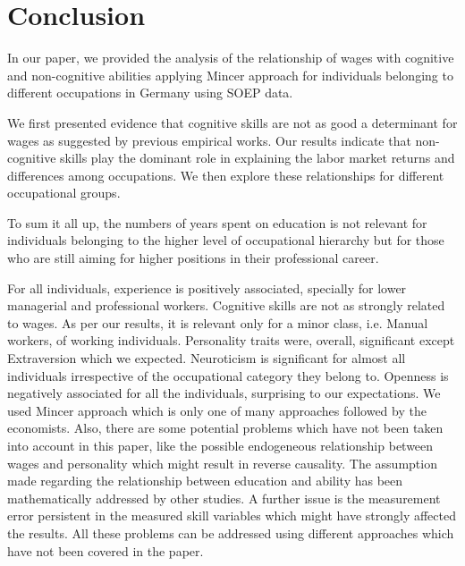 \documentclass[11pt, a4paper, leqno]{article}
\begin{document}
\section*{Conclusion}

In our paper, we provided the analysis of the relationship of wages with cognitive and non-cognitive abilities applying Mincer approach for individuals belonging to different occupations in Germany using SOEP data. \par
We first presented evidence that cognitive skills are not as good a determinant for wages as suggested by previous empirical works. Our results indicate that non-cognitive skills play the dominant role in explaining the labor market returns and differences among occupations.
We then explore these relationships for different occupational groups.\par
To sum it all up, the numbers of years spent on education is not relevant for individuals belonging to the higher level of occupational hierarchy but for those who are still aiming for higher positions in their professional career.\par
For all individuals, experience is positively associated, specially for lower managerial and professional workers.
Cognitive skills are not as strongly related to wages. As per our results, it is relevant only for a minor class, i.e. Manual workers, of working individuals.
Personality traits were, overall, significant except Extraversion which we expected. Neuroticism is significant for almost all individuals irrespective of the occupational category they belong to. Openness is negatively associated for all the individuals, surprising to our expectations. 
We used Mincer approach which is only one of many approaches followed by the economists. Also, there are some potential problems which have not been taken into account in this paper, like the possible endogeneous relationship between wages and personality which might result in reverse causality. The assumption made regarding the relationship between education and ability has been mathematically addressed by other studies. A further issue is the measurement error persistent in the measured skill variables which might have strongly affected the results. All these problems can be addressed using different approaches which have not been covered in the paper. 

\printbibliography
{}

\citet{Bound}
\citet{Howell}
\citet{Arias}




\end{document}
